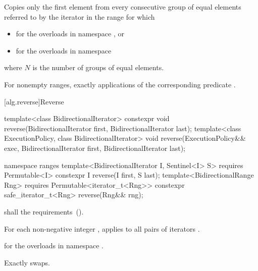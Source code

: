 \begin{itemdescr}
\pnum
\effects
Copies only the first element from every consecutive group of equal elements referred to by
the iterator
in the range
for which 

\pnum
\returns
{}
\begin{addedblock}
\begin{itemize}
\item {} for the overloads in namespace , or
\item {} for the overloads in namespace 
\end{itemize}
where $N$ is the number of groups of equal elements.
\end{addedblock}

\pnum
\complexity
For nonempty ranges, exactly
applications of the corresponding predicate
.
\end{itemdescr}


[alg.reverse]{Reverse}

%
\begin{itemdecl}
template<class BidirectionalIterator>
  constexpr void reverse(BidirectionalIterator first, BidirectionalIterator last);
template<class ExecutionPolicy, class BidirectionalIterator>
  void reverse(ExecutionPolicy&& exec,
               BidirectionalIterator first, BidirectionalIterator last);
\end{itemdecl}
\begin{addedblock}
\begin{itemdecl}
namespace ranges {
  template<BidirectionalIterator I, Sentinel<I> S>
    requires Permutable<I>
    constexpr I reverse(I first, S last);
  template<BidirectionalRange Rng>
    requires Permutable<iterator_t<Rng>>
    constexpr safe_iterator_t<Rng> reverse(Rng&& rng);
}
\end{itemdecl}
\end{addedblock}

\begin{itemdescr}
\pnum
\requires
{}
 shall  the
 requirements~().

\pnum
\effects
For each non-negative integer
,
applies
to all pairs of iterators
.

\begin{addedblock}
\pnum
\returns
{} for the overloads in namespace .
\end{addedblock}

\pnum
\complexity
Exactly
swaps.
\end{itemdescr}


